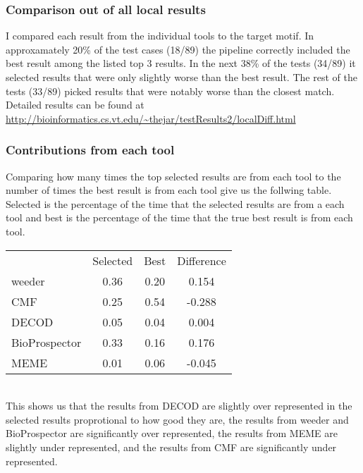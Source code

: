 \documentclass{article}
\begin{document}
\subsubsection{Comparison out of all local results}
I compared each result from the individual tools to the target motif. In
approxamately 20\% of the test cases
(18/89) the pipeline correctly included the best result among the listed top 3
results. In the next 38\% of the tests (34/89) it selected results that were
only slightly worse than the best result. The rest of the tests (33/89) picked
results that were notably worse than the closest match.\\
Detailed results can be found at
\url{http://bioinformatics.cs.vt.edu/~thejar/testResults2/localDiff.html}

\subsubsection{Contributions from each tool}
Comparing how many times the top selected results are from each tool to the
number of times the best result is from each tool give us the follwing table.
Selected is the percentage of the time that the selected results are from a
each tool and best is the percentage of the time that the true best result is
from each tool.\\

\begin{tabular}{lccc}
    &Selected&Best&Difference\\
    weeder&0.36&0.20&0.154\\
    CMF&0.25&0.54&-0.288\\
    DECOD&0.05&0.04&0.004\\
    BioProspector&0.33&0.16&0.176\\
    MEME&0.01&0.06&-0.045\\
\end{tabular}\\

\noindent
This shows us that the results from DECOD are slightly over represented in the
selected results proprotional to how good they are, the results from weeder and
BioProspector are significantly over represented, the results from MEME are
slightly under represented, and the results from CMF are significantly under
represented.\\
\end{document}
